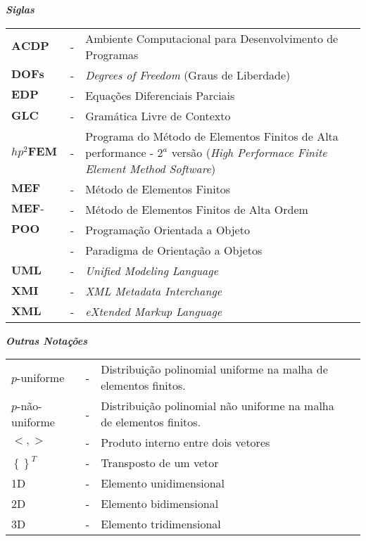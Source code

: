 \clearpage
\setcounter{page}{23}

\textbf{\emph{Siglas}}\\

\noindent
\begin{tabular}{l c p{.8\linewidth} c}
$\textbf{ACDP}$& - &Ambiente Computacional para Desenvolvimento de Programas\\
$\textbf{DOFs}$ & - & \textit{Degrees of Freedom} (Graus de Liberdade) \\
$\textbf{EDP}$ & - & Equações Diferenciais Parciais \\
$\textbf{GLC}$ & - & Gramática Livre de Contexto\\
$\textbf{$hp^2$FEM}$ & - & 
Programa do M\'{e}todo de Elementos Finitos de Alta performance - $2^{a}$ vers\~{a}o
(\emph{High Performace Finite Element Method Software})\\
$\textbf{MEF}$ & - & Método de Elementos Finitos\\
$\textbf{MEF-AO}$ & - & Método de Elementos Finitos de Alta Ordem\\
$\textbf{POO}$ & - & Programação Orientada a Objeto\\
$ $& - & Paradigma de Orientação a Objetos\\
$\textbf{UML}$ & - & \textit{Unified Modeling Language}\\
$\textbf{XMI}$ & - & \textit{XML Metadata Interchange}\\
$\textbf{XML}$ & - & \textit{eXtended Markup Language}\\
\end{tabular}
\newline \newline


\textbf{\emph{Outras Notações}}\\

\noindent
\begin{tabular}{l c p{.8\linewidth} l}
$p$-uniforme & - & Distribuição polinomial uniforme na malha de elementos finitos.\\
$p$-não-uniforme & - & Distribuição polinomial não uniforme na malha de elementos finitos.\\
$<,>$ & - & Produto interno entre dois vetores\\
$\left\{  \right\}^{T}$ & - & Transposto de um vetor\\
1D & - & Elemento unidimensional\\
2D & - & Elemento bidimensional\\
3D & - & Elemento tridimensional\\
\end{tabular}
